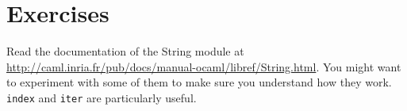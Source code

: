 \documentclass[10pt]{book}
\begin{document}
\section{Exercises}

\begin{ex}

Read the documentation of the String module at
\url{http://caml.inria.fr/pub/docs/manual-ocaml/libref/String.html}.
You might want to experiment with some of them to make sure
you understand how they work.  {\tt index} and
{\tt iter} are particularly useful.

\end{ex}

% 
% 
% 
% 
% 
% 
\end{document}
